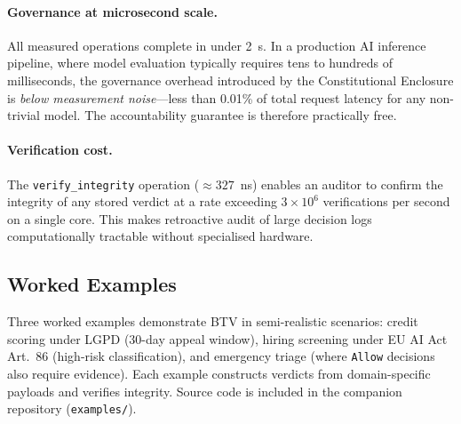 \paragraph{Governance at microsecond scale.}
All measured operations complete in under 2~\textmu{}s.  In a
production AI inference pipeline, where model evaluation typically
requires tens to hundreds of milliseconds, the governance overhead
introduced by the Constitutional Enclosure is
\emph{below measurement noise}---less than 0.01\% of total request
latency for any non-trivial model.  The accountability guarantee
is therefore practically free.

\paragraph{Verification cost.}
The \texttt{verify\_integrity} operation ($\approx 327$~ns) enables
an auditor to confirm the integrity of any stored verdict at a rate
exceeding $3 \times 10^6$ verifications per second on a single core.
This makes retroactive audit of large decision logs computationally
tractable without specialised hardware.

\subsection{Worked Examples}
\label{sec:worked-examples}

Three worked examples demonstrate BTV in semi-realistic scenarios: credit
scoring under LGPD (30-day appeal window), hiring screening under EU AI Act
Art.~86 (high-risk classification), and emergency triage (where \texttt{Allow}
decisions also require evidence).  Each example constructs verdicts from
domain-specific payloads and verifies integrity.  Source code is included in
the companion repository (\texttt{examples/}).
